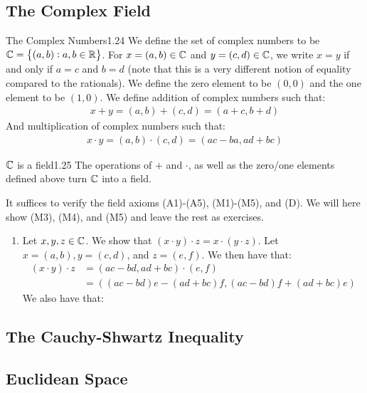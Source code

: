 \subsection{The Complex Field}
\setcounter{rudin}{23}
\begin{definition}{The Complex Numbers}{1.24}
    We define the set of complex numbers to be $\mathbb{C} = \set{(a, b): a, b \in \mathbb{R}}$. For $x = (a, b) \in \mathbb{C}$ and $y = (c, d) \in \mathbb{C}$, we write $x = y$ if and only if $a = c$ and $b = d$ (note that this is a very different notion of equality compared to the rationals). We define the zero element to be $(0, 0)$ and the one element to be $(1, 0)$. We define addition of complex numbers such that:
    \begin{align*}
        x + y = (a, b) + (c, d) = (a + c, b + d)
    \end{align*}
    And multiplication of complex numbers such that:
    \begin{align*}
        x\cdot y = (a, b)\cdot (c, d) = (ac - ba, ad + bc)
    \end{align*}
\end{definition}
\begin{theorem}{$\mathbb{C}$ is a field}{1.25}
    The operations of $+$ and $\cdot$, as well as the zero/one elements defined above turn $\mathbb{C}$ into a field. 
\end{theorem}
\begin{nproof}
    It suffices to verify the field axioms (A1)-(A5), (M1)-(M5), and (D). We will here show (M3), (M4), and (M5) and leave the rest as exercises. 
    \begin{enumerate}[start=3, label={(M\arabic*):}]
    \item Let $x, y, z \in \mathbb{C}$. We show that $(x\cdot y)\cdot z = x \cdot (y \cdot z)$. Let $x = (a, b), y = (c, d)$, and $z = (e, f)$. We then have that:
    \begin{align*}
        (x\cdot y) \cdot z &= (ac - bd, ad + bc) \cdot (e, f)
        \\ &= ((ac-bd)e - (ad+bc)f, (ac-bd)f + (ad+bc)e)
    \end{align*}
    We also have that:
    
    \end{enumerate}
    
\end{nproof}
\subsection{The Cauchy-Shwartz Inequality}

\subsection{Euclidean Space}


